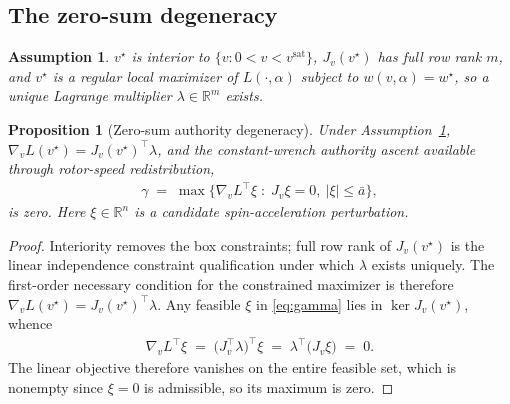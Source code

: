 \documentclass[letter, 10 pt, journal, twoside]{IEEEtran}
\theoremstyle{compact}
\newtheorem{proposition}[theorem]{Proposition}
\newtheorem{assumption}{Assumption}
\begin{document}


\subsection{The zero-sum degeneracy}

\begin{assumption}\label{as:regular}
$v^\star$ is interior to $\{v: 0<v<v^{\mathrm{sat}}\}$, $J_v(v^\star)$ has full row rank $m$, and $v^\star$ is a regular local maximizer of $L(\cdot,\alpha)$ subject to $w(v,\alpha)=w^\star$, so a unique Lagrange multiplier $\lambda\in\mathbb{R}^m$ exists.
\end{assumption}
 
\begin{proposition}[Zero-sum authority degeneracy]\label{prop:degeneracy}
Under Assumption~\ref{as:regular}, $\nabla_v L(v^\star)=J_v(v^\star)^{\!\top}\lambda$, and the constant-wrench authority ascent available through rotor-speed redistribution,
\begin{align}
    \gamma \;=\; \max\big\{\nabla_v L^{\!\top}\xi \;:\; J_v\xi = 0,\ |\xi|\le\bar a\big\},
    \label{eq:gamma}
\end{align}
is zero. Here $\xi\in\mathbb{R}^n$ is a candidate spin-acceleration perturbation.
\end{proposition}
 
\begin{proof}
Interiority removes the box constraints; full row rank of $J_v(v^\star)$ is the linear independence constraint qualification under which $\lambda$ exists uniquely. The first-order necessary condition for the constrained maximizer is therefore $\nabla_v L(v^\star)=J_v(v^\star)^{\!\top}\lambda$. Any feasible $\xi$ in \eqref{eq:gamma} lies in $\ker J_v(v^\star)$, whence
%
\begin{align}
    \nabla_v L^{\!\top}\xi
    \;=\; \big(J_v^{\!\top}\lambda\big)^{\!\top}\xi
    \;=\; \lambda^{\!\top}\big(J_v\xi\big) \;=\; 0 .
    \label{eq:zerosum}
\end{align}
%
The linear objective therefore vanishes on the entire feasible set, which is nonempty since $\xi=0$ is admissible, so its maximum is zero.
\end{proof}
\end{document}
